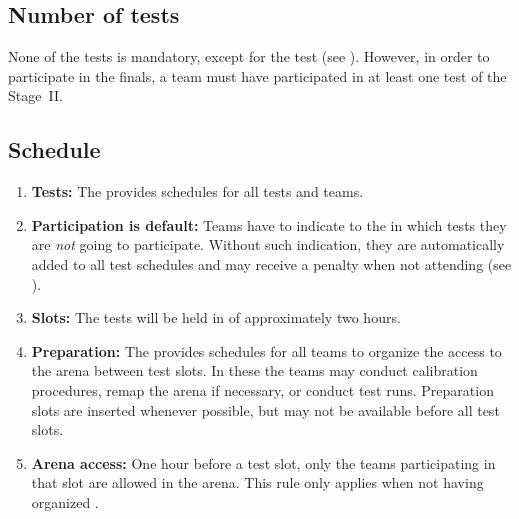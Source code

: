 \subsection{Number of tests}\label{rule:number_of_tests}
None of the tests is mandatory, except for the  test (see ). However, in order to participate in the finals, a team must have participated in at least one test of the Stage~II.


\subsection{Schedule}
\label{rule:schedule}

\begin{enumerate}
	\item \textbf{Tests:} The  provides schedules for all tests and teams. 
	\item \textbf{Participation is default:} Teams have to indicate to the  in which tests they are \emph{not} going to participate. Without such indication, they are automatically added to all test schedules and may receive a penalty when not attending (see ).
	\item \textbf{Slots:} The tests will be held in  of approximately two hours.
	\item \textbf{Preparation:} The  provides schedules for all teams to organize the access to the arena between test slots. In these  the teams may conduct calibration procedures, remap the arena if necessary, or conduct test runs.
	Preparation slots are inserted whenever possible, but may not be available before all test slots. 
	\item \textbf{Arena access:} One hour before a test slot, only the teams participating in that slot are allowed in the arena.
This rule only applies when not having organized .   
\end{enumerate}


